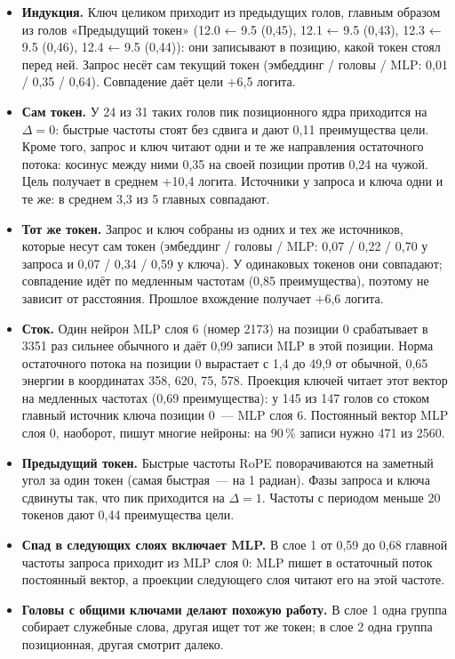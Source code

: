 \documentclass[10pt]{article}
\begin{document}
\begin{itemize}
\item \textbf{Индукция.} Ключ целиком приходит из предыдущих голов, главным образом из голов «Предыдущий токен» (12.0 ← 9.5 (0,45), 12.1 ← 9.5 (0,43), 12.3 ← 9.5 (0,46), 12.4 ← 9.5 (0,44)): они записывают в позицию, какой токен стоял перед ней. Запрос несёт сам текущий токен (эмбеддинг / головы / MLP: 0,01 / 0,35 / 0,64). Совпадение даёт цели $+$6,5 логита.
\item \textbf{Сам токен.} У 24 из 31 таких голов пик позиционного ядра приходится на $\Delta{=}0$: быстрые частоты стоят без сдвига и дают 0,11 преимущества цели. Кроме того, запрос и ключ читают одни и те же направления остаточного потока: косинус между ними 0,35 на своей позиции против 0,24 на чужой. Цель получает в среднем $+$10,4 логита. Источники у запроса и ключа одни и те же: в среднем 3,3 из 5 главных совпадают.
\item \textbf{Тот же токен.} Запрос и ключ собраны из одних и тех же источников, которые несут сам токен (эмбеддинг / головы / MLP: 0,07 / 0,22 / 0,70 у запроса и 0,07 / 0,34 / 0,59 у ключа). У одинаковых токенов они совпадают; совпадение идёт по медленным частотам (0,85 преимущества), поэтому не зависит от расстояния. Прошлое вхождение получает $+$6,6 логита.
\item \textbf{Сток.} Один нейрон MLP слоя 6 (номер 2173) на позиции 0 срабатывает в 3351 раз сильнее обычного и даёт 0,99 записи MLP в этой позиции. Норма остаточного потока на позиции 0 вырастает с 1,4 до 49,9 от обычной, 0,65 энергии в координатах 358, 620, 75, 578. Проекция ключей читает этот вектор на медленных частотах (0,69 преимущества): у 145 из 147 голов со стоком главный источник ключа позиции 0~— MLP слоя 6. Постоянный вектор MLP слоя 0, наоборот, пишут многие нейроны: на 90\,\% записи нужно 471 из 2560.
\end{itemize}
\begin{itemize}
\item \textbf{Предыдущий токен.} Быстрые частоты RoPE поворачиваются на заметный угол за один токен (самая быстрая~— на 1 радиан). Фазы запроса и ключа сдвинуты так, что пик приходится на $\Delta{=}1$. Частоты с периодом меньше 20 токенов дают 0,44 преимущества цели.
\item \textbf{Спад в следующих слоях включает MLP.} В слое 1 от 0,59 до 0,68 главной частоты запроса приходит из MLP слоя 0: MLP пишет в остаточный поток постоянный вектор, а проекции следующего слоя читают его на этой частоте.
\item \textbf{Головы с общими ключами делают похожую работу.} В слое 1 одна группа собирает служебные слова, другая ищет тот же токен; в слое 2 одна группа позиционная, другая смотрит далеко.
\end{itemize}
\end{document}
